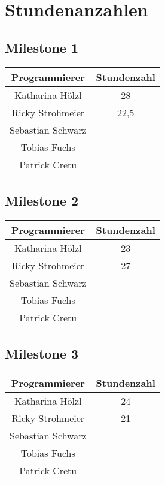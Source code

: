 \chapter{Stundenanzahlen}
\section{Milestone 1}
\begin{center}
	\begin{tabular}{|c|c|}
		\hline \textbf{Programmierer} & \textbf{Stundenzahl} \\ 
		\hline Katharina Hölzl  & 28 \\ 
		\hline Ricky Strohmeier & 22,5 \\ 
		\hline Sebastian Schwarz &  \\ 
		\hline Tobias Fuchs &  \\ 
		\hline Patrick Cretu &  \\ 
		\hline 
	\end{tabular}
\end{center} 
\section{Milestone 2}
\begin{center}
	\begin{tabular}{|c|c|}
		\hline \textbf{Programmierer} & \textbf{Stundenzahl} \\ 
		\hline Katharina Hölzl  & 23  \\ 
		\hline Ricky Strohmeier & 27\\ 
		\hline Sebastian Schwarz &  \\ 
		\hline Tobias Fuchs &  \\ 
		\hline Patrick Cretu &  \\ 
		\hline 
	\end{tabular}
\end{center} 
\section{Milestone 3}
\begin{center}
	\begin{tabular}{|c|c|}
		\hline \textbf{Programmierer} & \textbf{Stundenzahl} \\ 
		\hline Katharina Hölzl  & 24 \\ 
		\hline Ricky Strohmeier & 21\\ 
		\hline Sebastian Schwarz &  \\ 
		\hline Tobias Fuchs &  \\ 
		\hline Patrick Cretu &  \\ 
		\hline 
	\end{tabular}
\end{center} 
